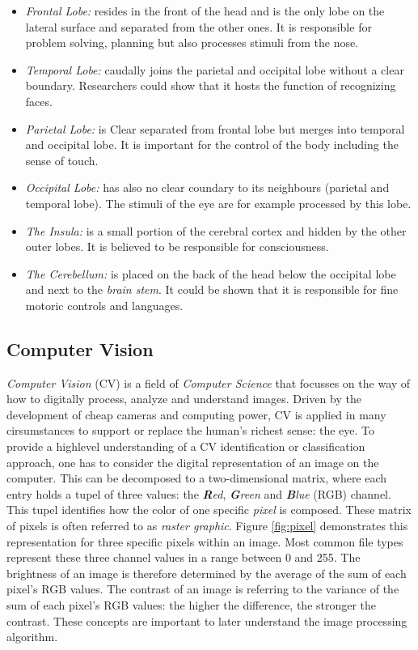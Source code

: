 \documentclass[twoside,11pt]{article}
\begin{document}
\begin{itemize}
	\item \textit{Frontal Lobe:} resides in the front of the head and is the only lobe on the lateral surface and separated from the other ones. It is responsible for problem solving, planning but also processes stimuli from the nose. 
	\item \textit{Temporal Lobe:} caudally joins the parietal and occipital lobe without a clear boundary. Researchers could show that it hosts the function of recognizing faces.
	\item \textit{Parietal Lobe:} is Clear separated from frontal lobe but merges into temporal and occipital lobe. It is important for the control of the body including the sense of touch.
	\item \textit{Occipital Lobe:} has also no clear coundary to its neighbours (parietal and temporal lobe). The stimuli of the eye are for example processed by this lobe.
	\item \textit{The Insula:} is a small portion of the cerebral cortex and hidden by the other outer lobes. It is believed to be responsible for  consciousness.
	\item \textit{The Cerebellum:} is placed on the back of the head below the occipital lobe and next to the \textit{brain stem}. It could be shown that it is responsible for fine motoric controls and languages.
\end{itemize}
\citep{duvernoy2012human}

\subsection{Computer Vision}
\textit{Computer Vision} (CV) is a field of \textit{Computer Science} that focusses on the way of how to digitally process, analyze and understand images. Driven by the development of cheap cameras and computing power, CV is applied in many cirsumstances to support or replace the human's richest sense: the eye.
To provide a highlevel understanding of a CV identification or classification approach, one has to consider the digital representation of an image on the computer. This can be decomposed to a two-dimensional matrix, where each entry holds a tupel of three values: the \textit{\textbf{R}ed}, \textit{\textbf{G}reen} and \textit{\textbf{B}lue} (RGB) channel. This tupel identifies how the color of one specific \textit{pixel} is composed. These matrix of pixels is often referred to as \textit{raster graphic}. Figure \ref{fig:pixel} demonstrates this representation for three specific pixels within an image. Most common file types represent these three channel values  in a range between 0 and 255. The brightness of an image is therefore determined by the average of the sum of each pixel's RGB values. The contrast of an image is referring to the variance of the sum of each pixel's RGB values: the higher the difference, the stronger the contrast. These concepts are important to later understand the image processing algorithm.
\end{document}
